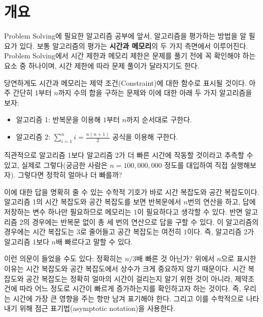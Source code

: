 \section{개요}
\label{sec: start}
Problem Solving에 필요한 알고리즘 공부에 앞서, 알고리즘을 평가하는 방법을 알 필요가 있다. 보통 알고리즘의 평가는 \textbf{시간과 메모리}의 두 가지 측면에서 이루어진다. Problem Solving에서 시간 제한과 메모리 제한은 문제를 풀기 전에 꼭 확인해야 하는 요소 중 하나이며, 시간 제한에 따라 문제 풀이가 달라지기도 한다.

당연하게도 시간과 메모리는 제약 조건(Constraint)에 대한 함수로 표시될 것이다. 아주 간단히 1부터 $n$까지 수의 합을 구하는 문제와 이에 대한 아래 두 가지 알고리즘을 보자:

\begin{itemize}
    \item 알고리즘 1: 반복문을 이용해 $1$부터 $n$까지 순서대로 구한다.
    \item 알고리즘 2: $\sum_{i=1}^n i = \frac{n(n+1)}{2}$ 공식을 이용해 구한다.
\end{itemize}

직관적으로 알고리즘 1보다 알고리즘 2가 더 빠른 시간에 작동할 것이라고 추측할 수 있고, 실제로 그렇다(궁금한 사람은 $n=100,000,000$ 정도를 대입하여 직접 실행해보자). 그렇다면 정학히 얼마나 더 빠를까?

이에 대한 답을 명확히 줄 수 있는 수학적 기호가 바로 시간 복잡도와 공간 복잡도이다. 알고리즘 1의 시간 복잡도와 공간 복잡도를 보면 반복문에서 $n$번의 연산을 하고, 답에 저장하는 변수 하나만 필요하므로 메모리는 $1$이 필요하다고 생각할 수 있다. 반면 알고리즘 2의 경우에는 반복문 없이 총 세 번의 연산으로 답을 구할 수 있다. 이 알고리즘의 경우에는 시간 복잡도는 $3$로 줄어들고 공간 복잡도는 여전히 $1$이다. 즉, 알고리즘 2가 알고리즘 1보다 $n$배 빠르다고 말할 수 있다.

이런 의문이 들었을 수도 있다: 정확히는 $n/3$배 빠른 것 아닌가? 위에서 $n$으로 표시한 이유는 시간 복잡도와 공간 복잡도에서 상수가 크게 중요하지 않기 때문이다. 시간 복잡도와 공간 복잡도는 정확히 얼마의 시간이 걸리는지 알기 위한 것이 아니라, 제약조건에 따라 어느 정도로 시간이 빠르게 증가하는지를 확인하고자 하는 것이다. 즉, 우리는 시간에 가장 큰 영향을 주는 항만 남겨 표기해야 한다. 그리고 이를 수학적으로 나타내기 위해 점근 표기법(asymptotic notation)을 사용한다.

